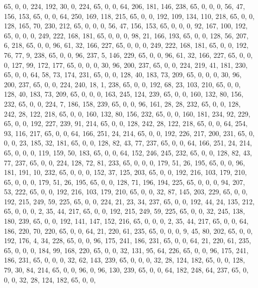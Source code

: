 \begin{DoxyCode}
       65, 0, 0, 224, 192, 30, 0, 224, 65, 0, 0, 64, 206, 181, 146, 238, 65, 0, 0, 0, 56, 47, 156, 153, 65, 0, 0,
       64, 250, 169, 118, 215, 65, 0, 0, 192, 109, 134, 110, 218, 65, 0, 0, 128, 165, 70, 230, 212, 65, 0, 0, 0, 56,
       47, 156, 153, 65, 0, 0, 0, 92, 167, 100, 192, 65, 0, 0, 0, 249, 222, 168, 181, 65, 0, 0, 0, 98, 21, 166,
       193, 65, 0, 0, 128, 56, 207, 6, 218, 65, 0, 0, 96, 61, 32, 166, 227, 65, 0, 0, 0, 249, 222, 168, 181, 65, 0, 0,
       192, 76, 77, 9, 238, 65, 0, 0, 96, 237, 5, 146, 229, 65, 0, 0, 96, 61, 32, 166, 227, 65, 0, 0, 0, 127, 99,
       172, 177, 65, 0, 0, 0, 30, 96, 200, 237, 65, 0, 0, 224, 219, 41, 181, 230, 65, 0, 0, 64, 58, 73, 174, 231,
       65, 0, 0, 128, 40, 183, 73, 209, 65, 0, 0, 0, 30, 96, 200, 237, 65, 0, 0, 224, 240, 18, 1, 238, 65, 0, 0,
       192, 68, 23, 103, 210, 65, 0, 0, 128, 40, 183, 73, 209, 65, 0, 0, 0, 163, 245, 124, 239, 65, 0, 0, 160, 132,
       80, 156, 232, 65, 0, 0, 224, 7, 186, 158, 239, 65, 0, 0, 96, 161, 28, 28, 232, 65, 0, 0, 128, 242, 28, 122,
       218, 65, 0, 0, 160, 132, 80, 156, 232, 65, 0, 0, 160, 181, 234, 92, 229, 65, 0, 0, 192, 227, 239, 91, 214, 65,
       0, 0, 128, 242, 28, 122, 218, 65, 0, 0, 64, 254, 93, 116, 217, 65, 0, 0, 64, 166, 251, 24, 214, 65, 0, 0,
       192, 226, 217, 200, 231, 65, 0, 0, 0, 23, 185, 32, 181, 65, 0, 0, 128, 82, 43, 77, 237, 65, 0, 0, 64, 166,
       251, 24, 214, 65, 0, 0, 0, 119, 159, 50, 183, 65, 0, 0, 64, 152, 246, 245, 232, 65, 0, 0, 128, 82, 43, 77,
       237, 65, 0, 0, 224, 128, 72, 81, 233, 65, 0, 0, 0, 179, 51, 26, 195, 65, 0, 0, 96, 181, 191, 10, 232, 65, 0, 0,
       0, 152, 37, 125, 203, 65, 0, 0, 192, 216, 103, 179, 210, 65, 0, 0, 0, 179, 51, 26, 195, 65, 0, 0, 128, 71,
       196, 194, 225, 65, 0, 0, 0, 94, 207, 53, 222, 65, 0, 0, 192, 216, 103, 179, 210, 65, 0, 0, 32, 87, 145, 203,
       229, 65, 0, 0, 192, 215, 249, 59, 225, 65, 0, 0, 224, 21, 23, 34, 237, 65, 0, 0, 192, 44, 24, 135, 212, 65,
       0, 0, 0, 2, 35, 44, 217, 65, 0, 0, 192, 215, 249, 59, 225, 65, 0, 0, 32, 245, 138, 180, 239, 65, 0, 0, 192,
       141, 147, 152, 216, 65, 0, 0, 0, 2, 35, 44, 217, 65, 0, 0, 64, 186, 220, 70, 220, 65, 0, 0, 64, 21, 220,
       61, 235, 65, 0, 0, 0, 9, 45, 80, 202, 65, 0, 0, 192, 176, 4, 34, 228, 65, 0, 0, 96, 175, 241, 186, 231, 65, 0,
       0, 64, 21, 220, 61, 235, 65, 0, 0, 0, 184, 99, 168, 220, 65, 0, 0, 32, 131, 95, 64, 226, 65, 0, 0, 96, 175,
       241, 186, 231, 65, 0, 0, 0, 32, 62, 143, 239, 65, 0, 0, 0, 32, 28, 124, 182, 65, 0, 0, 128, 79, 30, 84,
       214, 65, 0, 0, 96, 0, 96, 130, 239, 65, 0, 0, 64, 182, 248, 64, 237, 65, 0, 0, 0, 32, 28, 124, 182, 65, 0, 0,

\end{DoxyCode}
